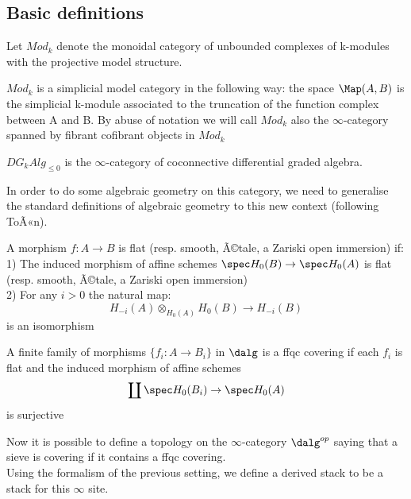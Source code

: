 \subsection{Basic definitions}

\begin{defin}
Let $Mod_k$ denote the monoidal category of unbounded complexes of k-modules with the projective model structure.
\end{defin}

\begin{prop}
$Mod_k$ is a simplicial model category in the following way: the space $\Map(A,B)$ is the simplicial k-module associated to the truncation of the function complex between
A and B. By abuse of notation we will call $Mod_k$ also the $\infty$-category spanned by fibrant cofibrant objects in $Mod_k$
\end{prop}

\begin{defin}
$DG_kAlg_{\le 0}$ is the $\infty$-category of coconnective differential graded algebra.
\end{defin}

In order to do some algebraic geometry on this category, we need to generalise the standard definitions of algebraic geometry to this new context (following ToÃ«n).\\
\begin{defin}
A morphism $f:A\to B$ is flat (resp. smooth, Ã©tale, a Zariski open immersion) if:\\
1) The induced morphism of affine schemes $\spec H_0(B)\to \spec H_0(A)$ is flat (resp. smooth, Ã©tale, a Zariski open immersion)\\
2) For any $i>0$ the natural map:
$$H_{-i}(A)\otimes_{H_0(A)}H_0(B)\to H_{-i}(B) $$
is an isomorphism
\end{defin}


\begin{defin}
A finite family of morphisms $\{ f_i:A\to B_i\}$ in $\dalg$ is a ffqc covering if each $f_i$ is flat and the induced morphism of affine schemes
$$\coprod \spec H_0(B_i)\to \spec H_0(A)$$
is surjective
\end{defin}

Now it is possible to define a topology on the $\infty$-category $\dalg^{op}$ saying that a sieve is covering if it contains a ffqc covering.\\
Using the formalism of the previous setting, we define a derived stack to be a stack for this $\infty$ site.\\


